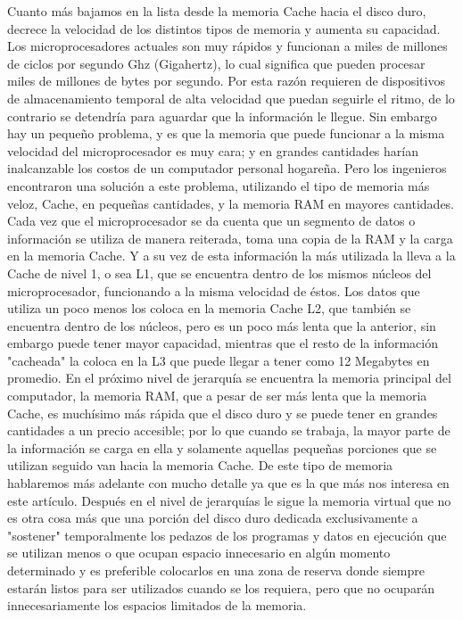 \documentclass{article}
\begin{document}
Cuanto más bajamos en la lista desde la memoria Cache hacia el disco duro, decrece la velocidad
de los distintos tipos de memoria y aumenta su capacidad.
Los microprocesadores actuales son muy rápidos y funcionan a miles de millones de ciclos por
segundo Ghz (Gigahertz), lo cual significa que pueden procesar miles de millones de bytes por
segundo. Por esta razón requieren de dispositivos de almacenamiento temporal de alta
velocidad que puedan seguirle el ritmo, de lo contrario se detendría para aguardar que la
información le llegue.
Sin embargo hay un pequeño problema, y es que la memoria que puede funcionar a la misma
velocidad del microprocesador es muy cara; y en grandes cantidades harían inalcanzable los
costos de un computador personal hogareña.
Pero los ingenieros encontraron una solución a este problema, utilizando el tipo de memoria
más veloz, Cache, en pequeñas cantidades, y la memoria RAM en mayores cantidades. Cada vez
que el microprocesador se da cuenta que un segmento de datos o información se utiliza de
manera reiterada, toma una copia de la RAM y la carga en la memoria Cache. Y a su vez de esta información la más utilizada la lleva a la Cache de nivel 1, o sea L1, que se encuentra dentro de
los mismos núcleos del microprocesador, funcionando a la misma velocidad de éstos. Los datos
que utiliza un poco menos los coloca en la memoria Cache L2, que también se encuentra dentro
de los núcleos, pero es un poco más lenta que la anterior, sin embargo puede tener mayor
capacidad, mientras que el resto de la información "cacheada" la coloca en la L3 que puede
llegar a tener como 12 Megabytes en promedio.
En el próximo nivel de jerarquía se encuentra la memoria principal del computador, la memoria
RAM, que a pesar de ser más lenta que la memoria Cache, es muchísimo más rápida que el disco
duro y se puede tener en grandes cantidades a un precio accesible; por lo que cuando se trabaja,
la mayor parte de la información se carga en ella y solamente aquellas pequeñas porciones que
se utilizan seguido van hacia la memoria Cache. De este tipo de memoria hablaremos más
adelante con mucho detalle ya que es la que más nos interesa en este artículo.
Después en el nivel de jerarquías le sigue la memoria virtual que no es otra cosa más que una
porción del disco duro dedicada exclusivamente a "sostener" temporalmente los pedazos de los
programas y datos en ejecución que se utilizan menos o que ocupan espacio innecesario en
algún momento determinado y es preferible colocarlos en una zona de reserva donde siempre
estarán listos para ser utilizados cuando se los requiera, pero que no ocuparán
innecesariamente los espacios limitados de la memoria.
\end{document}
